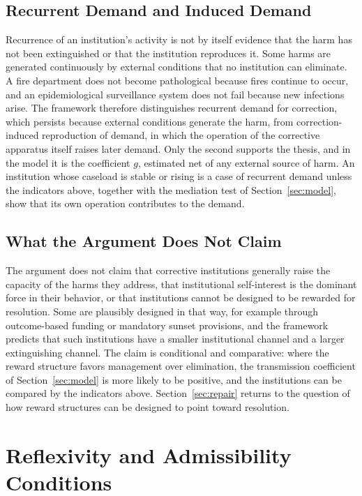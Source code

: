 \documentclass[12pt]{article}
\theoremstyle{remark}
\begin{document}
\subsection{Recurrent Demand and Induced Demand}

Recurrence of an institution's activity is not by itself evidence that the harm has not been extinguished or that the institution reproduces it. Some harms are generated continuously by external conditions that no institution can eliminate. A fire department does not become pathological because fires continue to occur, and an epidemiological surveillance system does not fail because new infections arise. The framework therefore distinguishes recurrent demand for correction, which persists because external conditions generate the harm, from correction-induced reproduction of demand, in which the operation of the corrective apparatus itself raises later demand. Only the second supports the thesis, and in the model it is the coefficient $g$, estimated net of any external source of harm. An institution whose caseload is stable or rising is a case of recurrent demand unless the indicators above, together with the mediation test of Section~\ref{sec:model}, show that its own operation contributes to the demand.

\subsection{What the Argument Does Not Claim}

The argument does not claim that corrective institutions generally raise the capacity of the harms they address, that institutional self-interest is the dominant force in their behavior, or that institutions cannot be designed to be rewarded for resolution. Some are plausibly designed in that way, for example through outcome-based funding or mandatory sunset provisions, and the framework predicts that such institutions have a smaller institutional channel and a larger extinguishing channel. The claim is conditional and comparative: where the reward structure favors management over elimination, the transmission coefficient of Section~\ref{sec:model} is more likely to be positive, and the institutions can be compared by the indicators above. Section~\ref{sec:repair} returns to the question of how reward structures can be designed to point toward resolution.

\section{Reflexivity and Admissibility Conditions}
\label{sec:reflex}
\end{document}
